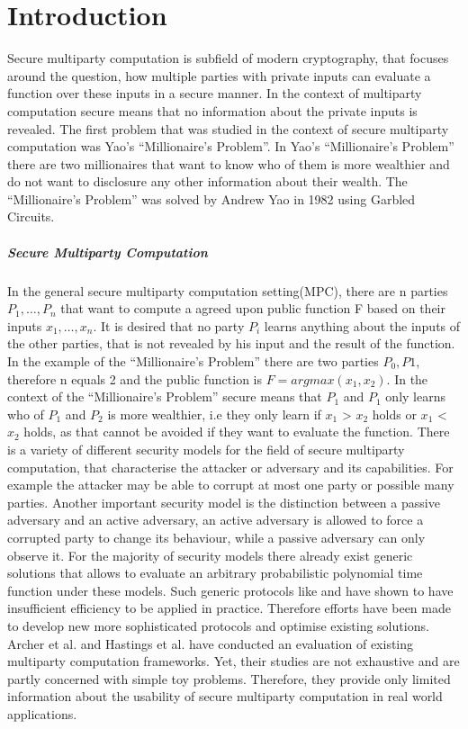 \chapter {Introduction}
Secure multiparty computation is subfield of modern cryptography, that focuses around the question, how multiple parties with private inputs can evaluate a function over these inputs in a secure manner. In the context of multiparty computation secure means that no information about the private inputs is revealed. The first problem that was studied in the context of secure multiparty computation was Yao's ``Millionaire’s Problem''. In Yao's ``Millionaire’s Problem'' there are two millionaires that want to know who of them is more wealthier and do not want to disclosure any other information about their wealth. The ``Millionaire’s Problem'' was solved by Andrew Yao in 1982 \cite{4568388} using Garbled Circuits.
\paragraph{Secure Multiparty Computation}
In the general secure multiparty computation setting(MPC), there are n parties $ P_1,\dots,P_{n} $ that want to compute a agreed upon public function F based on their inputs $ x_1,\dots,x_{n}$. It is desired that no party $P_i$ learns anything about the inputs of the other parties, that is not revealed by his input and the result of the function. In the example of the ``Millionaire’s Problem'' there are two parties $P_0,P1 $, therefore n equals 2 and the public function is $F=argmax(x_1,x_2)$. In the context of the ``Millionaire’s Problem'' secure means that $P_1$ and $P_1$ only learns who of $P_1$ and $P_2$ is more wealthier, i.e they only learn if $x_1$ > $x_2$ holds or $x_1$ < $x_2$ holds, as that cannot be avoided if they want to evaluate the function. 
There is a variety of different security models for the field of secure multiparty computation, that characterise the attacker or adversary and its capabilities. For example the attacker may be able to corrupt at most one party or possible many parties. Another important security model is the distinction between a passive adversary and an active adversary, an active adversary is allowed to force a corrupted party to change its behaviour, while a passive adversary can only observe it. 
For the majority of security models there already exist generic solutions that allows to evaluate an arbitrary probabilistic polynomial time function under these models. Such generic protocols like \cite{DBLP:conf/crypto/WigdersonD82} and \cite{4568388} have shown to have insufficient efficiency to be applied in practice. Therefore efforts have been made to develop new more sophisticated protocols and optimise existing solutions.
Archer et al. \cite{Archer2018FromKT} and Hastings et al. \cite{hastings2019sok} have conducted an evaluation of existing multiparty computation frameworks. Yet, their studies are not exhaustive and are partly concerned with simple toy problems.
Therefore, they provide only limited information about the usability of secure multiparty computation in real world applications.  
